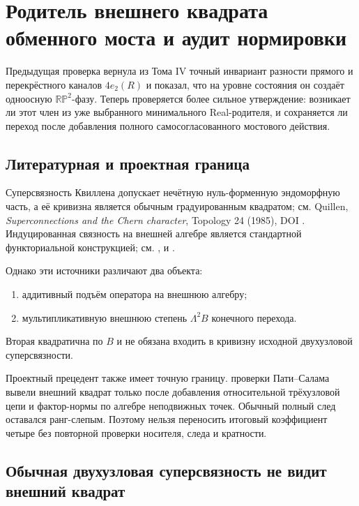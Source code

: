 \chapter{Родитель внешнего квадрата обменного моста и аудит нормировки}

Предыдущая проверка вернула из Тома IV точный инвариант разности прямого и перекрёстного каналов
$4e_2(R)$ и показал, что на уровне состояния он создаёт одноосную
$\mathbb{RP}^2$-фазу. Теперь проверяется более сильное утверждение:
возникает ли этот член из уже выбранного минимального Real-родителя, и
сохраняется ли переход после добавления полного самосогласованного
мостового действия.

\section{Литературная и проектная граница}

Суперсвязность Квиллена допускает нечётную нуль-форменную эндоморфную
часть, а её кривизна является обычным градуированным квадратом; см.
Quillen, \emph{Superconnections and the Chern character}, Topology 24
(1985), DOI . Индуцированная связность
на внешней алгебре является стандартной функториальной конструкцией; см.
,  и
.

Однако эти источники различают два объекта:
\begin{enumerate}
 \item аддитивный подъём оператора на внешнюю алгебру;
 \item мультипликативную внешнюю степень $\Lambda^2B$ конечного перехода.
\end{enumerate}
Вторая квадратична по $B$ и не обязана входить в кривизну исходной
двухузловой суперсвязности.

Проектный прецедент также имеет точную границу. проверки Пати--Салама вывели
внешний квадрат только после добавления относительной трёхузловой цепи и
фактор-нормы по алгебре неподвижных точек. Обычный полный след оставался
ранг-слепым. Поэтому нельзя переносить итоговый коэффициент четыре без
повторной проверки носителя, следа и кратности.

\section{Обычная двухузловая суперсвязность не видит внешний квадрат}

